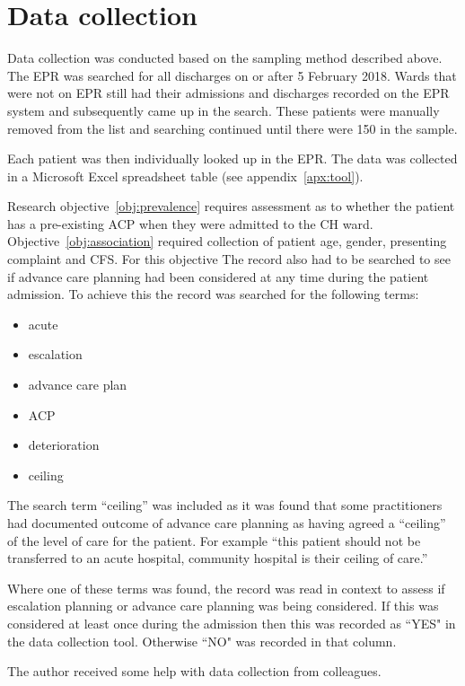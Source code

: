 \documentclass
[
	12pt,
	a4paper,
	oneside,
]{report}
\begin{document}
\section{Data collection}

Data collection was conducted based on the sampling method described above.
The EPR was searched for all discharges on or after 5 February 2018. Wards
that were not on EPR still had their admissions and discharges recorded on the
EPR system and subsequently came up in the search. These patients were 
manually removed from the list and searching continued until there were 150
in the sample.

Each patient was then individually looked up in the EPR. The data was
collected in a Microsoft Excel spreadsheet table (see appendix~\ref{apx:tool}).

Research objective~\ref{obj:prevalence} requires assessment as to whether the 
patient has a pre-existing ACP when they were admitted to the CH ward. 
Objective~\ref{obj:association} required collection of patient age, gender,
presenting complaint and CFS.  
For this objective The record also had to be searched to see if advance care
planning had been considered at any time during the patient admission. To 
achieve this the record was searched for the following terms:

\begin{itemize}
\item acute
\item escalation
\item advance care plan
\item ACP
\item deterioration
\item ceiling
\end{itemize}

The search term ``ceiling'' was included as it was found that some practitioners
had documented outcome of advance care planning as having agreed a ``ceiling'' 
of the level of care for the patient. For example ``this patient should not be
transferred to an acute hospital, community hospital is their ceiling of care.''

Where one of these terms was found, the record was read in context to assess if 
escalation planning or advance care planning was being considered. If this
was considered at least once during the admission then this was recorded as 
``YES"
in the data collection tool. Otherwise ``NO" was recorded in that column.

The author received some help with data collection from colleagues.
\end{document}
